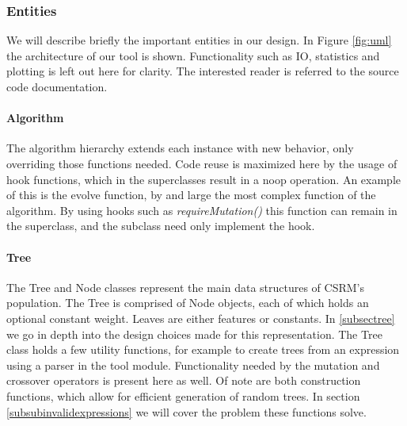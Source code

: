 \subsubsection{Entities}
We will describe briefly the important entities in our design. In Figure \ref{fig:uml} the architecture of our tool is shown. Functionality such as IO, statistics and plotting is left out here for clarity. The interested reader is referred to the source code documentation.
\paragraph{Algorithm}
The algorithm hierarchy extends each instance with new behavior, only overriding those functions needed. Code reuse is maximized here by the usage of hook functions, which in the superclasses result in a noop operation. An example of this is the evolve function, by and large the most complex function of the algorithm. By using hooks such as \textit{requireMutation()} this function can remain in the superclass, and the subclass need only implement the hook.
\paragraph{Tree}
The Tree and Node classes represent the main data structures of CSRM's population. The Tree is comprised of Node objects, each of which holds an optional constant weight. Leaves are either features or constants.
In \ref{subsectree} we go in depth into the design choices made for this representation.
The Tree class holds a few utility functions, for example to create trees from an expression using a parser in the tool module.
Functionality needed by the mutation and crossover operators is present here as well. Of note are both construction functions, which allow for efficient generation of random trees. In section \ref{subsubinvalidexpressions} we will cover the problem these functions solve.

